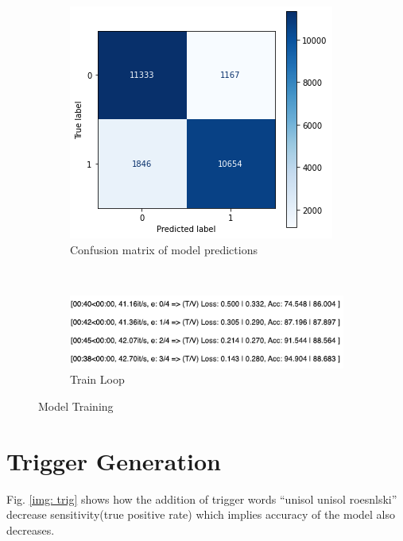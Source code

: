 \documentclass[12pt]{report}
\begin{document}
\begin{spacing}{1.5}
\begin{figure}[ht!]
    \centering
    \begin{subfigure}[t]{0.3\textwidth}
        \centering
        \includegraphics[width=\linewidth]{./img/output/cm_og.png}
        \caption{Confusion matrix of model predictions}
        \label{cm_og}
    \end{subfigure}%
    ~ 
    \begin{subfigure}[t]{0.5\textwidth}
        \centering
        \includegraphics[width=\linewidth]{./img/output/train_loop.png}
        \caption{Train Loop}
    \end{subfigure}
    \caption{Model Training}
 \end{figure}

\section{Trigger Generation}
Fig. \ref{img: trig} shows how the addition of trigger words ``unisol unisol roesnlski'' decrease sensitivity(true positive rate) which implies accuracy of the model also decreases.


\end{spacing}
\end{document}
